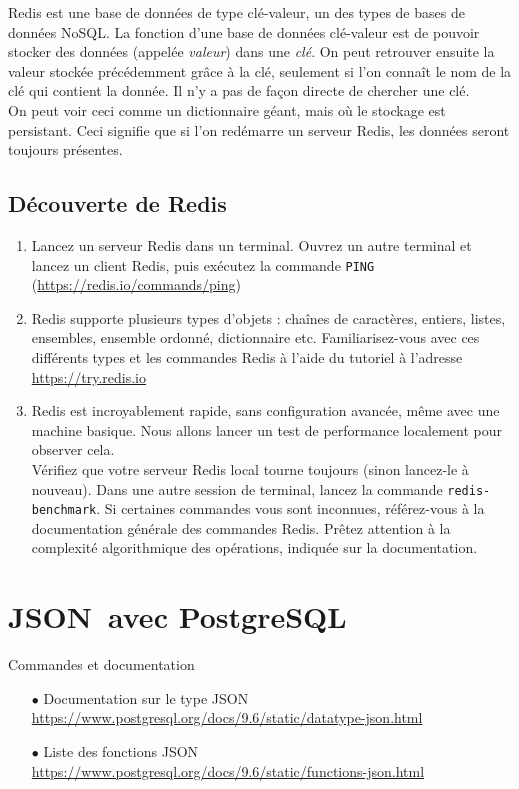 \documentclass[a4paper,10pt]{article}
\begin{document}
  Redis est une base de données de type clé-valeur, un des types de bases de données NoSQL. La fonction d'une base de données clé-valeur est de pouvoir stocker des données (appelée \textit{valeur}) dans une \textit{clé}. On peut retrouver ensuite la valeur stockée précédemment grâce à la clé, seulement si l'on connaît le nom de la clé qui contient la donnée. Il n'y a pas de façon directe de chercher une clé.\\

  On peut voir ceci comme un dictionnaire géant, mais où le stockage est persistant. Ceci signifie que si l'on redémarre un serveur Redis, les données seront toujours présentes.
  \subsection{Découverte de Redis}
    \begin{enumerate}
      \item Lancez un serveur Redis dans un terminal. Ouvrez un autre terminal et lancez un client Redis, puis exécutez la commande \texttt{PING} (\url{https://redis.io/commands/ping})
      \item Redis supporte plusieurs types d'objets : chaînes de caractères, entiers, listes, ensembles, ensemble ordonné, dictionnaire etc. Familiarisez-vous avec ces différents types et les commandes Redis à l'aide du tutoriel à l'adresse \url{https://try.redis.io}
      \item Redis est incroyablement rapide, sans configuration avancée, même avec une machine basique. Nous allons lancer un test de performance localement pour observer cela.\\

      Vérifiez que votre serveur Redis local tourne toujours (sinon lancez-le à nouveau). Dans une autre session de terminal, lancez la commande \texttt{redis-benchmark}. Si certaines commandes vous sont inconnues, référez-vous à la documentation générale des commandes Redis. Prêtez attention à la complexité algorithmique des opérations, indiquée sur la documentation.
    \end{enumerate}


\section{JSON avec PostgreSQL}
  \begin{bclogo}[logo = \bctakecare, arrondi = 0.1, ombre = true , epOmbre = 0.1, couleurOmbre = black!30,  barre =none, couleurBarre=bleuF]{Commandes et documentation}
    \begin{itemize}
    \item[$\bullet$] Documentation sur le type JSON \url{https://www.postgresql.org/docs/9.6/static/datatype-json.html}
    \item[$\bullet$] Liste des fonctions JSON \url{https://www.postgresql.org/docs/9.6/static/functions-json.html}
   \end{itemize}
  \end{bclogo}
\end{document}
